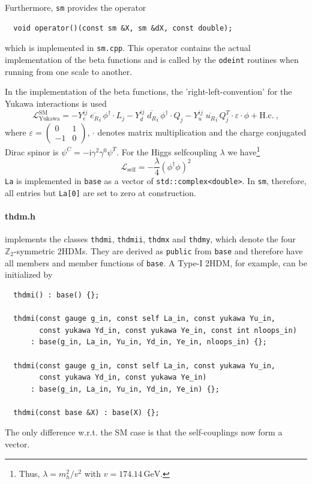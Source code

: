 \documentclass[11pt,a4paper]{article}
\begin{document}
Furthermore, \texttt{sm} provides the operator
\begin{lstlisting}
  void operator()(const sm &X, sm &dX, const double);
\end{lstlisting}
which is implemented in \texttt{sm.cpp}. This operator contains the actual implementation of the beta functions and is called by the \texttt{odeint} routines when running from one scale to another.

In the implementation of the beta functions, the 'right-left-convention' for the Yukawa interactions is used
\begin{equation} \label{eq:sm_yuk}
    \mathcal{L}_{\mathrm{Yukawa}}^{\mathrm{SM}} = - Y_e^{ij}\; \overline{e_{R}}_{i} \, \phi^\dagger \cdot L_j
  - Y_d^{ij}\; \overline{d_{R}}_{i} \, \phi^\dagger \cdot Q_j
  - Y_u^{ij}\; \overline{u_{R}}_{i} \, Q_j^T \cdot \varepsilon \cdot \phi + \mathrm{H.c.}~,
\end{equation}
where $\varepsilon = \left(\begin{smallmatrix} 0 & 1 \\ -1 & 0 \end{smallmatrix}\right)$, $\cdot$ denotes matrix multiplication and the charge conjugated Dirac spinor is $\psi^C = -\mathrm{i}\gamma^2\gamma^0\psi^T$. For the Higgs selfcoupling $\lambda$ we have\footnote{Thus, $\lambda = m_h^2/v^2$ with $v=174.14\,\mathrm{GeV}$.}
\begin{equation} \label{eq:sm_la}
  \mathcal{L}_{\mathrm{self}} = -\frac{\lambda}{4} (\phi^\dagger\phi)^2
\end{equation}
\texttt{La} is implemented in \texttt{base} as a vector of \texttt{std::complex<double>}. In \texttt{sm}, therefore, all entries but \texttt{La[0]} are set to zero at construction.

\paragraph{thdm.h}
implements the classes \texttt{thdmi}, \texttt{thdmii}, \texttt{thdmx} and \texttt{thdmy}, which denote the four $\mathbb{Z}_2$-symmetric 2HDMs.
They are derived as \texttt{public} from \texttt{base} and therefore have all members and member functions of \texttt{base}.
A Type-I 2HDM, for example, can be initialized by
\begin{lstlisting}
  thdmi() : base() {};
 
  thdmi(const gauge g_in, const self La_in, const yukawa Yu_in,
        const yukawa Yd_in, const yukawa Ye_in, const int nloops_in)
      : base(g_in, La_in, Yu_in, Yd_in, Ye_in, nloops_in) {};
      
  thdmi(const gauge g_in, const self La_in, const yukawa Yu_in,
        const yukawa Yd_in, const yukawa Ye_in)
      : base(g_in, La_in, Yu_in, Yd_in, Ye_in) {};
      
  thdmi(const base &X) : base(X) {};
\end{lstlisting}
The only difference w.r.t. the SM case is that the self-couplings now form a vector.
\end{document}
